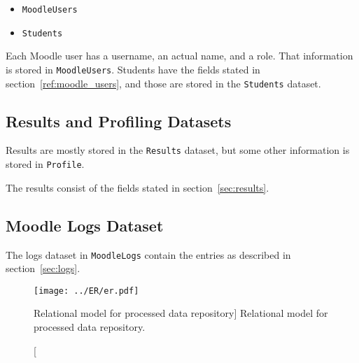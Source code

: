 \begin{itemize}
    \item \texttt{MoodleUsers}
    \item \texttt{Students}
\end{itemize}

Each Moodle user has a username, an actual name, and a role. That information
is stored in \texttt{MoodleUsers}. Students have the fields stated in
section~\ref{ref:moodle_users}, and those are stored in the \texttt{Students}
dataset.

\subsection{Results and Profiling Datasets}

Results are mostly stored in the \texttt{Results} dataset, but some other
information is stored in \texttt{Profile}.

The results consist of the fields stated in section~\ref{sec:results}.


\subsection{Moodle Logs Dataset}

The logs dataset in \texttt{MoodleLogs} contain the entries as described in
section~\ref{sec:logs}.

\begin{figure}[h!]
    \centering

    \texttt{[image: ../ER/er.pdf]}

    \caption
        [Relational model for processed data repository]
        {Relational model for processed data repository.}

    \label{fig:er}
\end{figure}
